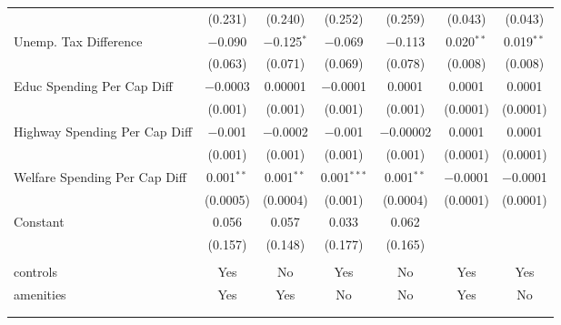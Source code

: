 \begin{table}[!htbp]
\begin{tabular}{@{\extracolsep{5pt}}lcccccc}
  & (0.231) & (0.240) & (0.252) & (0.259) & (0.043) & (0.043) \\ 
  Unemp. Tax Difference & $-$0.090 & $-$0.125$^{*}$ & $-$0.069 & $-$0.113 & 0.020$^{**}$ & 0.019$^{**}$ \\ 
  & (0.063) & (0.071) & (0.069) & (0.078) & (0.008) & (0.008) \\ 
  Educ Spending Per Cap Diff & $-$0.0003 & 0.00001 & $-$0.0001 & 0.0001 & 0.0001 & 0.0001 \\ 
  & (0.001) & (0.001) & (0.001) & (0.001) & (0.0001) & (0.0001) \\ 
  Highway Spending Per Cap Diff & $-$0.001 & $-$0.0002 & $-$0.001 & $-$0.00002 & 0.0001 & 0.0001 \\ 
  & (0.001) & (0.001) & (0.001) & (0.001) & (0.0001) & (0.0001) \\ 
  Welfare Spending Per Cap Diff & 0.001$^{**}$ & 0.001$^{**}$ & 0.001$^{***}$ & 0.001$^{**}$ & $-$0.0001 & $-$0.0001 \\ 
  & (0.0005) & (0.0004) & (0.001) & (0.0004) & (0.0001) & (0.0001) \\ 
  Constant & 0.056 & 0.057 & 0.033 & 0.062 &  &  \\ 
  & (0.157) & (0.148) & (0.177) & (0.165) &  &  \\ 
 \hline \\[-1.8ex] 
controls & Yes & No & Yes & No & Yes & Yes \\ 
amenities & Yes & Yes & No & No & Yes & No \\ 
\hline \\[-1.8ex] 
\hline 
\hline \\[-1.8ex] 
\end{tabular} 
\end{table} 
